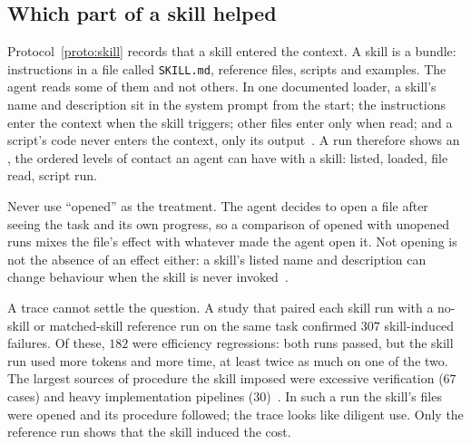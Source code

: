 \subsection{Which part of a skill helped}\label{sec:stp-skill-attribution}

Protocol~\ref{proto:skill} records that a skill entered the context. A skill
is a bundle: instructions in a file called \texttt{SKILL.md}, reference
files, scripts and examples. The agent reads some of them and not others. In
one documented loader, a skill's name and description sit in the system
prompt from the start; the instructions enter the context when the skill
triggers; other files enter only when read; and a script's code never enters
the context, only its output~. A run therefore
shows an , the ordered levels of contact an agent can
have with a skill: listed, loaded, file read, script run.

Never use ``opened'' as the treatment. The agent decides to open a file
after seeing the task and its own progress, so a comparison of opened with
unopened runs mixes the file's effect with whatever made the agent open it.
Not opening is not the absence of an effect either: a skill's listed name
and description can change behaviour when the skill is never
invoked~.

A trace cannot settle the question. A study that paired each skill run with
a no-skill or matched-skill reference run on the same task confirmed $307$
skill-induced failures. Of these, $182$ were efficiency regressions: both
runs passed, but the skill run used more tokens and more time, at least
twice as much on one of the two. The largest sources of procedure the skill
imposed were excessive verification ($67$ cases) and heavy implementation
pipelines ($30$)~.
In such a run the skill's files were opened and its procedure followed; the
trace looks like diligent use. Only the reference run shows that the skill
induced the cost.

